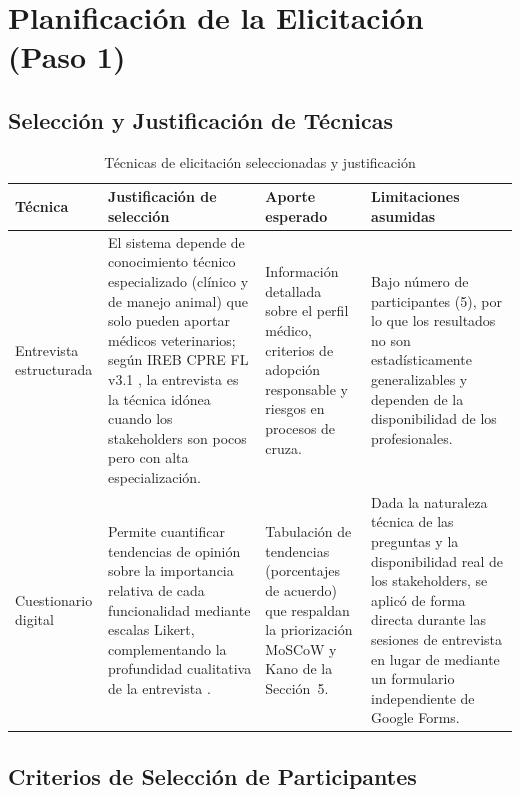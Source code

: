 \documentclass[journal,onecolumn]{IEEEtran}
\begin{document}
\newpage

\section{Planificación de la Elicitación (Paso 1)}

\subsection{Selección y Justificación de Técnicas}

\begin{table}[H]
\caption{Técnicas de elicitación seleccionadas y justificación}
\label{tab:tecnicas}
\begin{tabularx}{\textwidth}{|l|X|X|X|}
\hline
\textbf{Técnica} & \textbf{Justificación de selección} & \textbf{Aporte esperado} & \textbf{Limitaciones asumidas} \\
\hline
Entrevista estructurada &
El sistema depende de conocimiento técnico especializado (clínico y de
manejo animal) que solo pueden aportar médicos veterinarios; según
IREB CPRE FL v3.1 \cite{ireb2023}, la entrevista es la técnica idónea
cuando los stakeholders son pocos pero con alta especialización. &
Información detallada sobre el perfil médico, criterios de adopción
responsable y riesgos en procesos de cruza. &
Bajo número de participantes (5), por lo que los resultados no son
estadísticamente generalizables y dependen de la disponibilidad de los
profesionales. \\
\hline
Cuestionario digital &
Permite cuantificar tendencias de opinión sobre la importancia relativa
de cada funcionalidad mediante escalas Likert, complementando la
profundidad cualitativa de la entrevista \cite{ireb2023}. &
Tabulación de tendencias (porcentajes de acuerdo) que respaldan la
priorización MoSCoW y Kano de la Sección~5. &
Dada la naturaleza técnica de las preguntas y la disponibilidad real de
los stakeholders, se aplicó de forma directa durante las sesiones de
entrevista en lugar de mediante un formulario independiente de Google
Forms. \\
\hline
\end{tabularx}
\end{table}

\subsection{Criterios de Selección de Participantes}
\end{document}
